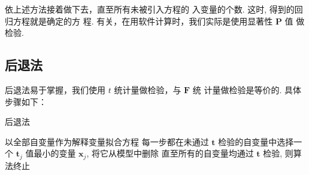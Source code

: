 依上述方法接着做下去，直至所有未被引入方程的
入变量的个数. 这时, 得到的回归方程就是确定的方
程. 
有关，在用软件计算时，我们实际是使用显著性 \( \boldsymbol{P} \) 值
做检验. 

\subsection{后退法}

后退法易于掌握，我们使用 \( t \) 统计量做检验，与 \( \boldsymbol{F} \) 统
计量做检验是等价的. 具体步骤如下：

\begin{algorithm}
    \caption{后退法}
    以全部自变量作为解释变量拟合方程\;
    每一步都在未通过 \( \boldsymbol{t} \) 检验的自变量中选择一个
\( \boldsymbol{t}_{j} \) 值最小的变量 \( \boldsymbol{x}_{j} \), 将它从模型中删除\;
    直至所有的自变量均通过 \( \boldsymbol{t} \) 检验, 则算法终止\;
\end{algorithm}
